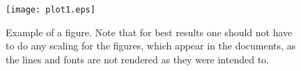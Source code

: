 \begin{figure}[h]
    \centering %
    \texttt{[image: plot1.eps]}  %
    \caption{
        Example of a figure.
        Note that for best results one should not have to do any scaling
            for the figures, which appear in the documents, as the lines
            and fonts are not rendered as they were intended to.
    }
    \label{fig:plot1} %
\end{figure}
